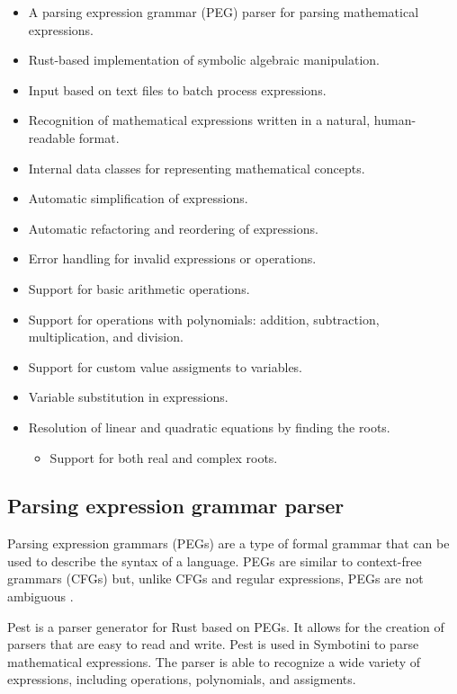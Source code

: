 \begin{itemize}
    \item A parsing expression grammar (PEG) parser for parsing mathematical expressions.
    \item Rust-based implementation of symbolic algebraic manipulation.
    \item Input based on text files to batch process expressions.
    \item Recognition of mathematical expressions written in a natural, human-readable format.
    \item Internal data classes for representing mathematical concepts.
    \item Automatic simplification of expressions.
    \item Automatic refactoring and reordering of expressions.
    \item Error handling for invalid expressions or operations.
    \item Support for basic arithmetic operations.
    \item Support for operations with polynomials: addition, subtraction, multiplication, and division.
    \item Support for custom value assigments to variables.
    \item Variable substitution in expressions.
    \item Resolution of linear and quadratic equations by finding the roots.
        \begin{itemize}
            \item Support for both real and complex roots.
        \end{itemize}
\end{itemize}

\subsection{Parsing expression grammar parser}\label{subsec:peg-parser}

Parsing expression grammars (PEGs) are a type of formal grammar that can be used to describe the syntax of a language. PEGs are similar to context-free grammars (CFGs) but, unlike CFGs and regular expressions, PEGs are not ambiguous \parencite{pest-book,ford2004parsing}.

Pest \parencite{pest-book} is a parser generator for Rust based on PEGs. It allows for the creation of parsers that are easy to read and write. Pest is used in Symbotini to parse mathematical expressions. The parser is able to recognize a wide variety of expressions, including operations, polynomials, and assigments.

